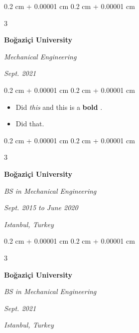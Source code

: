 \documentclass[10pt, letterpaper]{article}
\newenvironment{highlights}{
    \begin{itemize}[
        topsep=0.10 cm,
        parsep=0.10 cm,
        partopsep=0pt,
        itemsep=0pt,
        leftmargin=0.4 cm + 10pt + 0.6 cm
    ]
}{
    \end{itemize}
} %
\newenvironment{onecolentry}{
    \begin{adjustwidth}{
        0.2 cm + 0.00001 cm
    }{
        0.2 cm + 0.00001 cm
    }
}{
    \end{adjustwidth}
} %
\newenvironment{threecolentry}[3][]{
    \onecolentry
    \def\thirdColumn{#3}
    \setcolumnwidth{0.6 cm, \fill, 4.1 cm}
    \begin{paracol}{3}
    #2 \switchcolumn
}{
    \switchcolumn \raggedleft \thirdColumn
    \end{paracol}
    \endonecolentry
} %
\let\hrefWithoutArrow\href
\renewcommand{\href}[2]{\hrefWithoutArrow{#1}{\mbox{\ifthenelse{\equal{#2}{}}{ }{#2 }\raisebox{.15ex}{\footnotesize \faExternalLink*}}}}
\begin{document}
        \vspace{0.2 cm}

        \begin{threecolentry}{
            \vspace*{\fill}
            \textbullet
            \vspace*{3px}
            \vspace*{\fill}
        }{
        \textit{Sept. 2021}
            
        }
            \textbf{Boğaziçi University}

            \textit{Mechanical Engineering}
        \end{threecolentry}

        \vspace{0.10 cm}
        \begin{onecolentry}
            \begin{highlights}
                \item Did \textit{this} and this is a \textbf{bold} \href{https://example.com}{link}.
                \item Did that.
            \end{highlights}
        \end{onecolentry}


        \vspace{0.2 cm}

        \begin{threecolentry}{
            \vspace*{\fill}
            \textbullet
            \vspace*{3px}
            \vspace*{\fill}
        }{
        \textit{Sept. 2015 to June 2020}
            
        \textit{Istanbul, Turkey}}
            \textbf{Boğaziçi University}

            \textit{BS in Mechanical Engineering}
        \end{threecolentry}



        \vspace{0.2 cm}

        \begin{threecolentry}{
            \vspace*{\fill}
            \textbullet
            \vspace*{3px}
            \vspace*{\fill}
        }{
        \textit{Sept. 2021}
            
        \textit{Istanbul, Turkey}}
            \textbf{Boğaziçi University}

            \textit{BS in Mechanical Engineering}
        \end{threecolentry}
\end{document}
